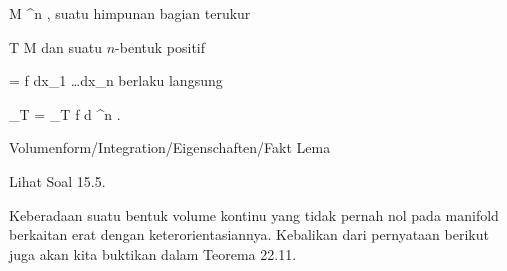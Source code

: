 \mavergleichskette
{\vergleichskette
{ M
}
{ \subseteq }{ \R^n
}
{  }{
}
{    }{
}
{   }{
}
}
{}{}{,}
suatu himpunan bagian terukur

\mavergleichskette
{\vergleichskette
{ T
}
{ \subseteq }{ M
}
{  }{
}
{    }{
}
{   }{
}
}
{}{}{}
dan suatu $n$-bentuk positif

\mavergleichskette
{\vergleichskette
{ \omega
}
{ = }{ f dx_1 \wedge \ldots \wedge dx_n
}
{  }{
}
{    }{
}
{   }{
}
}
{}{}{}
berlaku langsung

\mavergleichskettedisp
{\vergleichskette
{ \int_T \omega
}
{ =} { \int_T f d \lambda^n
}
{ } {
}
{ } {
}
{ } {
}
}
{}{}{.}


{Volumenform/Integration/Eigenschaften/Fakt}
{Lema}
{}
{

\faktzusatz {}
\faktzusatz {}

 }
{ Lihat Soal 15.5. }


Keberadaan suatu bentuk volume kontinu yang tidak pernah nol pada manifold berkaitan erat dengan keterorientasiannya. Kebalikan dari pernyataan berikut juga akan kita buktikan dalam
Teorema 22.11.



